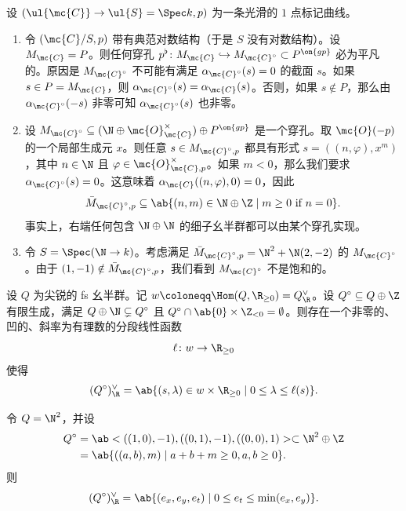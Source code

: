 \begin{exm}
    设 \((\ul{\mc{C}} \to \ul{S} = \Spec k, p)\) 为一条光滑的 \(1\) 点标记曲线。
    \begin{enumerate}
        \item 令 \((\mc{C}/S, p)\) 带有典范对数结构（于是 \(S\) 没有对数结构）。设 \(M_{\mc{C}} = P\)。则任何穿孔 \(p^{\flat} \colon M_{\mc{C}} \hookrightarrow M_{\mc{C}^{\circ}} \subset P^{\on{gp}}\) 必为平凡的。原因是 \(M_{\mc{C}^{\circ}}\) 不可能有满足 \(\alpha_{\mc{C}^{\circ}}(s) = 0\) 的截面 \(s\)。如果 \(s \in P = M_{\mc{C}}\)，则 \(\alpha_{\mc{C}^{\circ}}(s) = \alpha_{\mc{C}}(s)\)。否则，如果 \(s \notin P\)，那么由 \(\alpha_{\mc{C}^{\circ}}(-s)\) 非零可知 \(\alpha_{\mc{C}^{\circ}}(s)\) 也非零。
        \item 设 \(M_{\mc{C}^{\circ}} \subseteq (\N \oplus \mc{O}_{\mc{C}}^{\times}) \oplus P^{\on{gp}}\) 是一个穿孔。取 \(\mc{O}(-p)\) 的一个局部生成元 \(x\)。则任意 \(s \in M_{\mc{C}^{\circ}, p}\) 都具有形式 \(s = ((n, \varphi), x^m)\)，其中 \(n \in \N\) 且 \(\varphi \in \mc{O}_{\mc{C}, p}^{\times}\)。如果 \(m < 0\)，那么我们要求 \(\alpha_{\mc{C}^{\circ}}(s) = 0\)。这意味着 \(\alpha_{\mc{C}}((n, \varphi), 0) = 0\)，因此
            \[ \bar{M}_{\mc{C}^{\circ}, p} \subseteq \ab\{(n, m) \in \N \oplus \Z \mid m \geq 0 \text{ if } n = 0 \}. \]
            事实上，右端任何包含 \(\N \oplus \N\) 的细子幺半群都可以由某个穿孔实现。
        \item 令 \(S = \Spec(\N \to k)\)。考虑满足 \(\bar{M}_{\mc{C}^{\circ}, p} = \N^2 + \N (2,-2)\) 的 \(M_{\mc{C}^{\circ}}\)。由于 \((1,-1) \notin \bar{M}_{\mc{C}^{\circ}, p}\)，我们看到 \(M_{\mc{C}^{\circ}}\) 不是饱和的。
    \end{enumerate}
\end{exm}

\begin{lem}
    设 \(Q\) 为尖锐的 fs 幺半群。记 \(w \coloneqq \Hom(Q, \R_{\geq 0}) = Q_{\R}^{\vee}\)。设 \(Q^{\circ} \subseteq Q \oplus \Z\) 有限生成，满足 \(Q \oplus \N \subsetneq Q^{\circ}\) 且 \(Q^{\circ} \cap \ab\{0\} \times \Z_{<0} = \emptyset\)。则存在一个非零的、凹的、斜率为有理数的分段线性函数
    \[ \ell \colon w \to \R_{\geq 0} \]
    使得
    \[ (Q^{\circ})_{\R}^{\vee} = \ab\{ (s, \lambda) \in w \times \R_{\geq 0} \mid 0 \leq \lambda \leq \ell(s) \}. \]
\end{lem}

\begin{exm}
    令 \(Q = \N^2\)，并设
    \begin{align*}
        Q^{\circ} &= \ab<((1,0), -1), ((0,1), -1), ((0,0),1)> \subset \N^2 \oplus \Z \\
        &= \ab\{((a,b), m) \mid a+b+m \geq 0, a,b \geq 0 \}.
    \end{align*}
    则
    \[ (Q^{\circ})_{\R}^{\vee} = \ab\{ (e_x, e_y, e_t) \mid 0 \leq e_t \leq \min(e_x, e_y) \}. \]
\end{exm}
